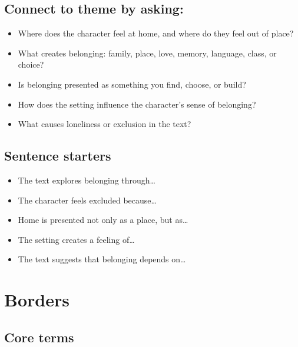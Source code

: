 \documentclass[10pt,a4paper]{article}
\begin{document}
\subsection*{Connect to theme by asking:}

\begin{itemize}
	\item Where does the character feel at home, and where do they feel out of place?
	\item What creates belonging: family, place, love, memory, language, class, or choice?
	\item Is belonging presented as something you find, choose, or build?
	\item How does the setting influence the character's sense of belonging?
	\item What causes loneliness or exclusion in the text?
\end{itemize}

\subsection*{Sentence starters}

\begin{itemize}
	\item The text explores belonging through\ldots
	\item The character feels excluded because\ldots
	\item Home is presented not only as a place, but as\ldots
	\item The setting creates a feeling of\ldots
	\item The text suggests that belonging depends on\ldots
\end{itemize}

\newpage
\section{Borders}

\subsection*{Core terms}
\end{document}
